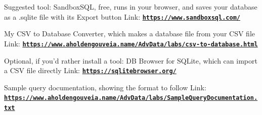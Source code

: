 \documentclass[12pt]{article}
\begin{document}
Suggested tool: SandboxSQL, free, runs in your browser, and saves your database as a .sqlite file with its Export button
Link: \href{https://www.sandboxsql.com/}{\textbf{\nolinkurl{https://www.sandboxsql.com/}}}

My CSV to Database Converter, which makes a database file from your CSV file
Link: \href{https://www.aholdengouveia.name/AdvData/labs/csv-to-database.html}{\textbf{\nolinkurl{https://www.aholdengouveia.name/AdvData/labs/csv-to-database.html}}}

Optional, if you'd rather install a tool: DB Browser for SQLite, which can import a CSV file directly
Link: \href{https://sqlitebrowser.org/}{\textbf{\nolinkurl{https://sqlitebrowser.org/}}}

Sample query documentation, showing the format to follow
Link: \href{https://www.aholdengouveia.name/AdvData/labs/SampleQueryDocumentation.txt}{\textbf{\nolinkurl{https://www.aholdengouveia.name/AdvData/labs/SampleQueryDocumentation.txt}}}
\end{document}
